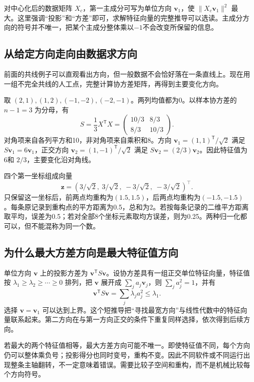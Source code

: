 对中心化后的数据矩阵 $X_c$，第一主成分可写为单位方向 $\mathbf v_1$，使 $\|X_c\mathbf v_1\|^2$ 最大。这里强调“投影”和“方差”即可，求解特征向量的完整推导可以选读。主成分方向的符号并不唯一，把某个主成分整体乘以$-1$不会改变所保留的信息。

\subsection{从给定方向走向由数据求方向}
前面的共线例子可以直观看出方向，但一般数据不会恰好落在一条直线上。现在用一组不完全共线的人工点，完整计算协方差矩阵，再得到主要变化方向。

取 $(2,1),(1,2),(-1,-2),(-2,-1)$。两列均值都为0。以样本协方差的 $n-1=3$ 为分母，有
\[
S=\frac1{3}X^\mathsf TX=
\begin{pmatrix}10/3&8/3\\8/3&10/3\end{pmatrix}.
\]
对角项来自各列平方和10，非对角项来自乘积和8。方向 $\mathbf v_1=(1,1)^\mathsf T/\sqrt2$ 满足 $S\mathbf v_1=6\mathbf v_1$，正交方向 $\mathbf v_2=(1,-1)^\mathsf T/\sqrt2$ 满足 $S\mathbf v_2=(2/3)\mathbf v_2$。因此特征值为6和 $2/3$，主要变化沿对角线。

四个第一坐标组成向量
\[
\mathbf z=(3/\sqrt2,\;3/\sqrt2,\;-3/\sqrt2,\;-3/\sqrt2)^\top.
\]
只保留这一坐标后，前两点均重构为$(1.5,1.5)$，后两点均重构为$(-1.5,-1.5)$。每条原记录到重构点的平方距离为0.5，总和为2。若按每条记录的二维平方距离取平均，误差为0.5；若对全部8个坐标元素取均方误差，则为0.25。两种归一化都可以，但不能混称为同一个数。


\subsection{为什么最大方差方向是最大特征值方向}
单位方向 $\mathbf v$ 上的投影方差为 $\mathbf v^\mathsf TS\mathbf v$。设协方差具有一组正交单位特征向量，特征值按 $\lambda_1\geq\lambda_2\geq\cdots\geq0$ 排列，把 $\mathbf v$ 展开成 $\sum_ja_j\mathbf v_j$，则 $\sum_ja_j^2=1$，并有
\[
\mathbf v^\mathsf TS\mathbf v=\sum_j\lambda_j a_j^2\leq\lambda_1.
\]
选择 $\mathbf v=\mathbf v_1$ 可以达到上界。这个短推导把“寻找最宽方向”与线性代数中的特征向量联系起来。第二方向在与第一方向正交的条件下重复同样选择，依次得到后续方向。

若最大的两个特征值相等，最大方差方向可能不唯一。即使特征值不同，每个方向仍可以整体乘负号；投影得分也同时变号，重构不变。因此不同软件或不同运行出现整条主轴翻转，不一定意味着错误。需要比较子空间和重构，而不是机械比较每个方向符号。

